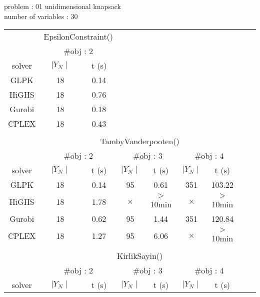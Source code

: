 \documentclass[11pt]{report}
\begin{document}
\noindent
problem : 01 unidimensional knapsack\\
number of variables  : 30

\begin{table}[htp]
\begin{center}
\begin{tabular}{|c|c|c|c|c|c|c|c|c|}

\cline{2-3}
\multicolumn{1}{c}{} & \multicolumn{2}{|c|}{EpsilonConstraint()} \\
\cline{2-3}
\multicolumn{1}{c}{} & \multicolumn{2}{|c|}{\#obj : 2 }\\
\cline{1-3}
solver & $\mid Y_N \mid$ & t (s)\\
\cline{1-3}
GLPK   &  18   & 0.14  \\
HiGHS  &  18   & 0.76 \\
Gurobi  &   18   & 0.18 \\
CPLEX &   18   & 0.43 \\
\cline{1-3}
\multicolumn{7}{c}{} \\
\cline{2-7}
\multicolumn{1}{c}{}  & \multicolumn{6}{|c|}{TambyVanderpooten()} \\
%
\cline{2-7}
\multicolumn{1}{c}{} & \multicolumn{2}{|c|}{\#obj : 2 } 
                                & \multicolumn{2}{|c|}{\#obj : 3 } 
                                & \multicolumn{2}{|c|}{\#obj : 4 }\\
\hline
solver & $\mid Y_N \mid$ & t (s) 
           & $\mid Y_N \mid$ & t (s)
           & $\mid Y_N \mid$ & t (s)\\                                
\hline
GLPK   &  18   & 0.14  & 95 & 0.61  & 351 & 103.22 \\
HiGHS  &  18   & 1.78 & $\times$ & $>$10min & $\times$ & $>$10min\\
Gurobi  &   18   & 0.62 & 95 & 1.44 & 351 & 120.84\\
CPLEX &   18   & 1.27 & 95 & 6.06 & $\times$ & $>$10min \\
\hline
\multicolumn{7}{c}{} \\
%
\cline{2-7}
\multicolumn{1}{c}{}  & \multicolumn{6}{|c|}{KirlikSayin()} \\
%
\cline{2-7}
\multicolumn{1}{c}{} & \multicolumn{2}{|c|}{\#obj : 2 } 
                                & \multicolumn{2}{|c|}{\#obj : 3 } 
                                & \multicolumn{2}{|c|}{\#obj : 4 }\\
\hline
solver & $\mid Y_N \mid$ & t (s) 
           & $\mid Y_N \mid$ & t (s)
           & $\mid Y_N \mid$ & t (s)\\                                

\end{tabular}
\end{center}
\end{table}
\end{document}
